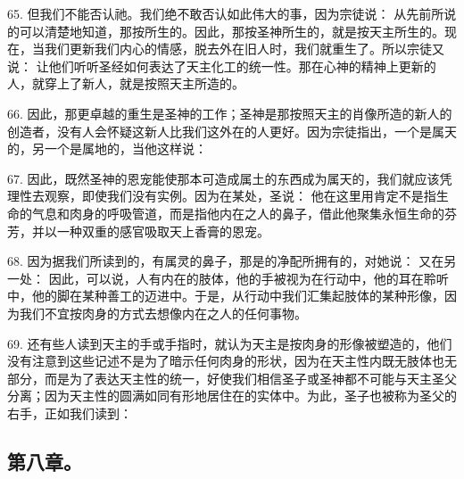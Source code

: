 65. 但我们不能否认祂。我们绝不敢否认如此伟大的事，因为宗徒说：  从先前所说的可以清楚地知道，那按所生的。因此，那按圣神所生的，就是按天主所生的。现在，当我们更新我们内心的情感，脱去外在旧人时，我们就重生了。所以宗徒又说：  让他们听听圣经如何表达了天主化工的统一性。那在心神的精神上更新的人，就穿上了新人，就是按照天主所造的。\par

66. 因此，那更卓越的重生是圣神的工作；圣神是那按照天主的肖像所造的新人的创造者，没有人会怀疑这新人比我们这外在的人更好。因为宗徒指出，一个是属天的，另一个是属地的，当他这样说： \par

67. 因此，既然圣神的恩宠能使那本可造成属土的东西成为属天的，我们就应该凭理性去观察，即使我们没有实例。因为在某处，圣说：  他在这里用肯定不是指生命的气息和肉身的呼吸管道，而是指他内在之人的鼻子，借此他聚集永恒生命的芬芳，并以一种双重的感官吸取天上香膏的恩宠。\par

68. 因为据我们所读到的，有属灵的鼻子，那是的净配所拥有的，对她说：  又在另一处：  因此，可以说，人有内在的肢体，他的手被视为在行动中，他的耳在聆听中，他的脚在某种善工的迈进中。于是，从行动中我们汇集起肢体的某种形像，因为我们不宜按肉身的方式去想像内在之人的任何事物。\par

69. 还有些人读到天主的手或手指时，就认为天主是按肉身的形像被塑造的，他们没有注意到这些记述不是为了暗示任何肉身的形状，因为在天主性内既无肢体也无部分，而是为了表达天主性的统一，好使我们相信圣子或圣神都不可能与天主圣父分离；因为天主性的圆满如同有形地居住在的实体中。为此，圣子也被称为圣父的右手，正如我们读到：\par


\subsection{第八章。}

